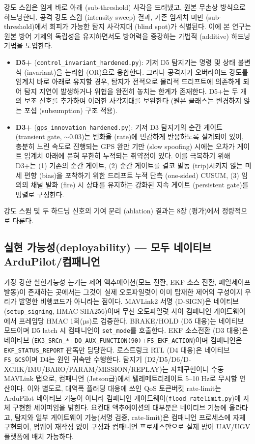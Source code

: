 강도 스윕은 임계 바로 아래 (sub-threshold) 사각을 드러냈고, 원본 무손상 방식으로 하드닝한다.
공격 강도 스윕 (intensity sweep) 결과, 기존 임계치 미만 (sub-threshold)에서 회피가 가능한 탐지 사각지대 (blind spot)가 식별된다. 이에 본 연구는 원본 방어 기제의 독립성을 유지하면서도 방어력을 증강하는 가법적 (additive) 하드닝 기법을 도입한다.
\begin{itemize}[leftmargin=*]
    \item \textbf{D5+} (\texttt{control\_invariant\_hardened.py}): 기저 D5 탐지기는 명령 및 상태 불변식 (invariant)을 논리합 (OR)으로 융합한다. 그러나 공격자가 오버라이드 강도를 임계치 바로 아래로 유지할 경우, 탐지가 전적으로 물리적 드리프트에 의존하게 되어 탐지 지연이 발생하거나 위협을 완전히 놓치는 한계가 존재한다. D5+는 두 개의 보조 신호를 추가하여 이러한 사각지대를 보완한다 (원본 클래스는 변경하지 않는 포섭 (subsumption) 구조 적용).
    \item \textbf{D3+} (\texttt{gps\_innovation\_hardened.py}): 기저 D3 탐지기의 순간 게이트 (transient gate, $\sim$0.03)는 변화율 (rate)에 민감하게 반응하도록 설계되어 있어, 충분히 느린 속도로 진행되는 GPS 완만 기만 (slow spoofing) 시에는 오차가 게이트 임계치 아래에 묻혀 무한히 누적되는 취약점이 있다. 이를 극복하기 위해 D3+는 (1) 기존의 순간 게이트, (2) 순간 게이트를 결코 발동 (trip)시키지 않는 미세 편향 (bias)을 포착하기 위한 드리프트 누적 단측 (one-sided) CUSUM, (3) 임의의 채널 발화 (fire) 시 상태를 유지하는 강화된 지속 게이트 (persistent gate)를 병렬로 구성한다.
\end{itemize}

강도 스윕 및 두 하드닝 신호의 기여 분리 (ablation) 결과는 8장 (평가)에서 정량적으로 다룬다.

\subsection{실현 가능성(deployability) --- 모두 네이티브 ArduPilot/컴패니언}

가장 강한 실현가능성 논거는 제어 액추에이션(모드 전환, EKF 소스 전환, 페일세이프 발동)이 존재하는 곳에서는 그것이 실제 오토파일럿이 이미 탑재한 제어의 구성이지 우리가 발명한 비행코드가 아니라는 점이다. MAVLink2 서명 (D-SIGN)은 네이티브(\texttt{setup\_signing}, HMAC-SHA256)이며 무선-오토파일럿 사이 컴패니언 게이트웨이에서 프레임당 HMAC 1회(µs)로 검증한다. BRAKE/HOLD (D5 대응)는 네이티브 모드이며 D5 latch 시 컴패니언이 \texttt{set\_mode}를 호출한다. EKF 소스전환 (D3 대응)은 네이티브 (\texttt{EK3\_SRCn\_*}+\texttt{DO\_AUX\_FUNCTION(90)}+\texttt{FS\_EKF\_ACTION})이며 컴패니언은 \texttt{EKF\_STATUS\_REPORT} 판독만 담당한다. 로스트링크 RTL (D4 대응)은 네이티브 \texttt{FS\_GCS}이며 D4는 원인 귀속만 수행한다. 탐지기 (D2/D5/D6/D-XCHK/IMU/BARO/PARAM/MISSION/REPLAY)는 자체구현이나 수동 MAVLink 탭으로, 컴패니언 (Jetson급)에서 텔레메트리레이트 5--10 Hz로 무시할 연산이다. 이와 별도로, 대역폭 플러딩 대응에 쓰인 QoS 토큰버킷 rate-limit는 ArduPilot 네이티브 기능이 아니라 컴패니언 게이트웨이(\texttt{flood\_ratelimit.py})에 자체 구현한 셰이퍼임을 밝힌다. 요컨대 액추에이션의 대부분은 네이티브 기능에 올라타고, 탐지와 일부 게이트웨이 기능(서명 검증, rate-limit)은 컴패니언 프로세스에 자체 구현되어, 펌웨어 재작성 없이 구성과 컴패니언 프로세스만으로 실제 방어 UAV/UGV 플랫폼에 배치 가능하다.


